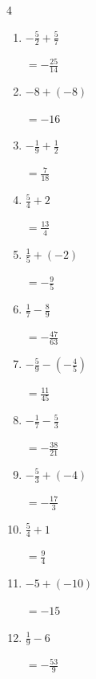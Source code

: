 \begin{multicols}{4}
\begin{enumerate}
        $\displaystyle =\frac{16}{9}$

  \item $\displaystyle -\frac{5}{2} + \frac{5}{7}$

        $\displaystyle =-\frac{25}{14}$

  \item $\displaystyle -8 + \left(-8\right)$

        $\displaystyle =-16$

  \item $\displaystyle -\frac{1}{9} + \frac{1}{2}$

        $\displaystyle =\frac{7}{18}$

  \item $\displaystyle \frac{5}{4} + 2$

        $\displaystyle =\frac{13}{4}$

  \item $\displaystyle \frac{1}{5} + \left(-2\right)$

        $\displaystyle =-\frac{9}{5}$

  \item $\displaystyle \frac{1}{7} - \frac{8}{9}$

        $\displaystyle =-\frac{47}{63}$

  \item $\displaystyle -\frac{5}{9} - \left(-\frac{4}{5}\right)$

        $\displaystyle =\frac{11}{45}$

  \item $\displaystyle -\frac{1}{7} - \frac{5}{3}$

        $\displaystyle =-\frac{38}{21}$

  \item $\displaystyle -\frac{5}{3} + \left(-4\right)$

        $\displaystyle =-\frac{17}{3}$

\columnbreak %

  \item $\displaystyle \frac{5}{4} + 1$

        $\displaystyle =\frac{9}{4}$

  \item $\displaystyle -5 + \left(-10\right)$

        $\displaystyle =-15$

  \item $\displaystyle \frac{1}{9} - 6$

        $\displaystyle =-\frac{53}{9}$


\end{enumerate}
\end{multicols}
